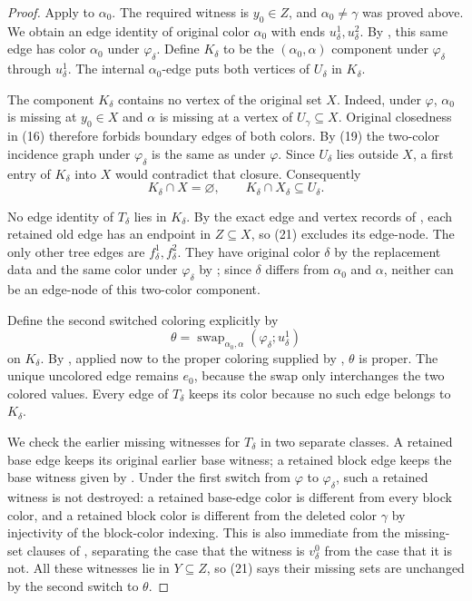 \begin{proof}
Apply  to $\alpha_0$.  The
required witness is $y_0\in Z$, and $\alpha_0\ne\gamma$ was proved above.
We obtain an edge identity of original color $\alpha_0$ with ends
$u^1_\delta,u^2_\delta$.  By
, this same edge has color
$\alpha_0$ under $\varphi_\delta$.  Define $K_\delta$ to be the
$(\alpha_0,\alpha)$ component under $\varphi_\delta$ through
$u^1_\delta$.  The internal $\alpha_0$-edge puts both vertices of
$U_\delta$ in $K_\delta$.

The component $K_\delta$ contains no vertex of the original set $X$.
Indeed, under $\varphi$, $\alpha_0$ is missing at $y_0\in X$ and
$\alpha$ is missing at a vertex of $U_\gamma\subseteq X$.  Original
closedness in (16) therefore forbids boundary edges of both colors.
By (19) the two-color incidence graph under $\varphi_\delta$ is the same
as under $\varphi$.  Since $U_\delta$ lies outside $X$, a first entry of
$K_\delta$ into $X$ would contradict that closure.  Consequently
\[
 K_\delta\cap X=\varnothing,
 \qquad K_\delta\cap X_\delta\subseteq U_\delta.               \tag{21}
\]

No edge identity of $T_\delta$ lies in $K_\delta$.  By the exact edge and
vertex records of , each retained old
edge has an endpoint in $Z\subseteq X$, so (21) excludes its edge-node.
The only other tree edges are $f^1_\delta,f^2_\delta$.  They have original
color $\delta$ by the replacement data and the same color under
$\varphi_\delta$ by ; since
$\delta$ differs from $\alpha_0$ and $\alpha$, neither can be an edge-node
of this two-color component.

Define the second switched coloring explicitly by
\[
 \theta=\operatorname{swap}_{\alpha_0,\alpha}
       (\varphi_\delta;u^1_\delta)
\]
on $K_\delta$.  By , applied now to
the proper coloring supplied by ,
$\theta$ is proper.  The unique uncolored edge remains $e_0$, because the
swap only interchanges the two colored values.  Every edge of
$T_\delta$ keeps its color because no such edge belongs to $K_\delta$.

We check the earlier missing witnesses for $T_\delta$ in two separate
classes.  A retained base edge keeps its original earlier base witness;
a retained block edge keeps the base witness given by
.  Under the first switch from
$\varphi$ to $\varphi_\delta$, such a retained witness is not destroyed:
a retained base-edge color is different from every block color, and a
retained block color is different from the deleted color $\gamma$ by
injectivity of the block-color indexing.  This is also immediate from the
missing-set clauses of , separating
the case that the witness is $v^0_\delta$ from the case that it is not.
All these witnesses lie in $Y\subseteq Z$, so (21) says their missing sets
are unchanged by the second switch to $\theta$.


\end{proof}
